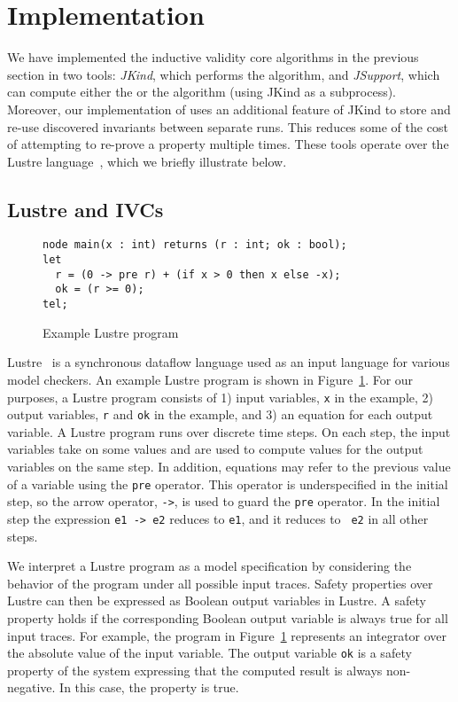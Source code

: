 \section{Implementation}
\label{sec:impl}

We have implemented the inductive validity core algorithms in the
previous section in two tools: {\em JKind}, which performs the \ucalg
algorithm, and {\em JSupport}, which can compute either the \bfalg or
the \ucbfalg algorithm (using JKind as a subprocess). Moreover, our
implementation of \ucbfalg uses an additional feature of JKind to
store and re-use discovered invariants between separate runs. This
reduces some of the cost of attempting to re-prove a property multiple
times. These tools operate over the Lustre
language~\cite{Halbwachs91:lustre}, which we briefly illustrate below.

\subsection{Lustre and IVCs}

\begin{figure}[t]
{\small
\begin{verbatim}
node main(x : int) returns (r : int; ok : bool);
let
  r = (0 -> pre r) + (if x > 0 then x else -x);
  ok = (r >= 0);
tel;
\end{verbatim}
}
  \caption{Example Lustre program}
  \label{fig:lustre-ex}
\end{figure}

Lustre~\cite{Halbwachs91:lustre} is a synchronous dataflow language
used as an input language for various model checkers. An example
Lustre program is shown in Figure~\ref{fig:lustre-ex}. For our
purposes, a Lustre program consists of 1) input variables, {\tt x} in
the example, 2) output variables, {\tt r} and {\tt ok} in the example,
and 3) an equation for each output variable. A Lustre program runs
over discrete time steps. On each step, the input variables take on
some values and are used to compute values for the output variables on
the same step. In addition, equations may refer to the previous value
of a variable using the {\tt pre} operator. This operator is
underspecified in the initial step, so the arrow operator, {\tt ->},
is used to guard the {\tt pre} operator. In the initial step the
expression {\tt e1 -> e2} reduces to {\tt e1}, and it reduces to {\tt
  e2} in all other steps.

We interpret a Lustre program as a model specification by considering
the behavior of the program under all possible input traces. Safety
properties over Lustre can then be expressed as Boolean output
variables in Lustre. A safety property holds if the corresponding
Boolean output variable is always true for all input traces. For
example, the program in Figure~\ref{fig:lustre-ex} represents an
integrator over the absolute value of the input variable. The output
variable {\tt ok} is a safety property of the system expressing that
the computed result is always non-negative. In this case, the property
is true.

